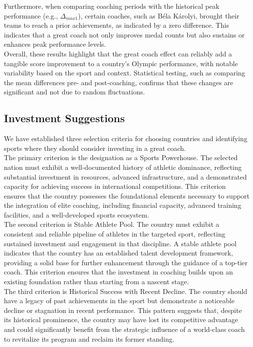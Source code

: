\documentclass[12pt]{article}
\begin{document}
Furthermore, when comparing coaching periods with the historical peak performance (e.g., $\Delta_{max1}$), certain coaches, such as Béla Károlyi, brought their teams to reach a prior achievements, as indicated by a zero difference. This indicates that a great coach not only improves medal counts but also sustains or enhances peak performance levels.\\

Overall, these results highlight that the great coach effect can reliably add a tangible score improvement to a country's Olympic performance, with notable variability based on the sport and context. Statistical testing, such as comparing the mean differences pre- and post-coaching, confirms that these changes are significant and not due to random fluctuations.


\subsection{Investment Suggestions}

\quad \quad We have established three selection criteria for choosing countries and identifying sports where they should consider investing in a great coach.\\

The primary criterion is the designation as a Sports Powerhouse. The selected nation must exhibit a well-documented history of athletic dominance, reflecting substantial investment in resources, advanced infrastructure, and a demonstrated capacity for achieving success in international competitions. This criterion ensures that the country possesses the foundational elements necessary to support the integration of elite coaching, including financial capacity, advanced training facilities, and a well-developed sports ecosystem.\\

The second criterion is Stable Athlete Pool. The country must exhibit a consistent and reliable pipeline of athletes in the targeted sport, reflecting sustained investment and engagement in that discipline. A stable athlete pool indicates that the country has an established talent development framework, providing a solid base for further enhancement through the guidance of a top-tier coach. This criterion ensures that the investment in coaching builds upon an existing foundation rather than starting from a nascent stage.\\

The third criterion is Historical Success with Recent Decline. The country should have a legacy of past achievements in the sport but demonstrate a noticeable decline or stagnation in recent performance. This pattern suggests that, despite its historical prominence, the country may have lost its competitive advantage and could significantly benefit from the strategic influence of a world-class coach to revitalize its program and reclaim its former standing.\\
\end{document}
